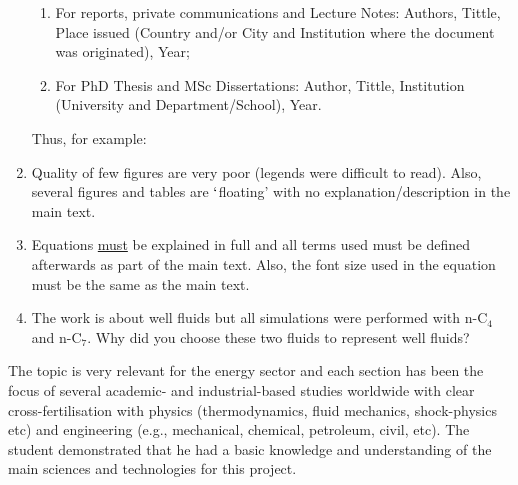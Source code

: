 \documentclass[14pt,twoside]{report}
\begin{document}
\begin{enumerate}
\begin{enumerate}
\item For reports,  private communications and Lecture Notes: Authors, Tittle, Place issued (Country and/or City and Institution where the document was originated), Year;
\item For PhD Thesis and MSc Dissertations: Author, Tittle, Institution (University and Department/School), Year.
\end{enumerate}  
Thus, for example:
%
\item Quality of few figures are very poor (legends were difficult to read). Also, several figures and tables are $\lq$floating' with no explanation/description in the main text.
%
\item Equations \underline{must} be explained in full and all terms used must be defined afterwards as part of the main text. Also, the font size used in the equation must be the same as the main text.  
%
\item The work is about well fluids but all simulations were performed with n-C$_{4}$ and n-C$_{7}$. Why did you choose these two fluids to represent well fluids?
%
\end{enumerate}
The topic is very relevant for the energy sector and each section has been the focus of several academic- and industrial-based studies worldwide with clear cross-fertilisation with physics (thermodynamics, fluid mechanics, shock-physics etc) and engineering (e.g., mechanical, chemical, petroleum, civil, etc). The student demonstrated that he had a basic knowledge and understanding of the main sciences and technologies for this project.
\end{document}
